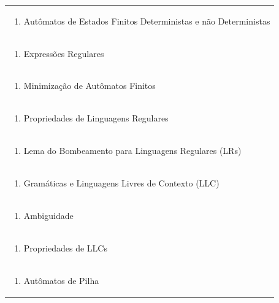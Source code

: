 \documentclass[11pt]{article}
\begin{document}
\begin{center}
\begin{longtable}{|p{4cm}|p{4cm}|p{4cm}|p{4cm}|}
\multicolumn{4}{|p{\dimexpr 16cm + 6\tabcolsep\relax}|}{\begin{enumerate}[start=2]\item Autômatos de Estados Finitos Deterministas e não Deterministas\end{enumerate}}\\
\multicolumn{4}{|p{\dimexpr 16cm + 6\tabcolsep\relax}|}{\begin{enumerate}[start=3]\item Expressões Regulares\end{enumerate}}\\
\multicolumn{4}{|p{\dimexpr 16cm + 6\tabcolsep\relax}|}{\begin{enumerate}[start=4]\item Minimização de Autômatos Finitos\end{enumerate}}\\
\multicolumn{4}{|p{\dimexpr 16cm + 6\tabcolsep\relax}|}{\begin{enumerate}[start=5]\item Propriedades de Linguagens Regulares\end{enumerate}}\\
\multicolumn{4}{|p{\dimexpr 16cm + 6\tabcolsep\relax}|}{\begin{enumerate}[start=6]\item Lema do Bombeamento para Linguagens Regulares (LRs)\end{enumerate}}\\
\multicolumn{4}{|p{\dimexpr 16cm + 6\tabcolsep\relax}|}{\begin{enumerate}[start=7]\item Gramáticas e Linguagens Livres de Contexto (LLC)\end{enumerate}}\\
\multicolumn{4}{|p{\dimexpr 16cm + 6\tabcolsep\relax}|}{\begin{enumerate}[start=8]\item Ambiguidade\end{enumerate}}\\
\multicolumn{4}{|p{\dimexpr 16cm + 6\tabcolsep\relax}|}{\begin{enumerate}[start=9]\item Propriedades de LLCs\end{enumerate}}\\
\multicolumn{4}{|p{\dimexpr 16cm + 6\tabcolsep\relax}|}{\begin{enumerate}[start=10]\item Autômatos de Pilha\end{enumerate}}\\

\end{longtable}
\end{center}
\end{document}
